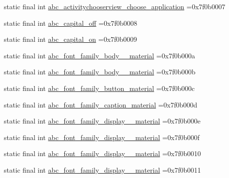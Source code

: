 \begin{DoxyCompactItemize}
static final int \mbox{\hyperlink{classbr_1_1unb_1_1cic_1_1mp_1_1marketmaster_1_1test_1_1R_1_1string_a04d1373e2193084ea31bf43980409963}{abc\+\_\+activitychooserview\+\_\+choose\+\_\+application}} =0x7f0b0007
\item 
static final int \mbox{\hyperlink{classbr_1_1unb_1_1cic_1_1mp_1_1marketmaster_1_1test_1_1R_1_1string_abb29aafbb17b7b46fbcc23c7dab3d6cd}{abc\+\_\+capital\+\_\+off}} =0x7f0b0008
\item 
static final int \mbox{\hyperlink{classbr_1_1unb_1_1cic_1_1mp_1_1marketmaster_1_1test_1_1R_1_1string_abb8733f06d3e6e1e84e5d7b7a4dae567}{abc\+\_\+capital\+\_\+on}} =0x7f0b0009
\item 
static final int \mbox{\hyperlink{classbr_1_1unb_1_1cic_1_1mp_1_1marketmaster_1_1test_1_1R_1_1string_a2884742ab8df9808f5d77505ec28fc39}{abc\+\_\+font\+\_\+family\+\_\+body\+\_\+\_\+material}} =0x7f0b000a
\item 
static final int \mbox{\hyperlink{classbr_1_1unb_1_1cic_1_1mp_1_1marketmaster_1_1test_1_1R_1_1string_aec76f189b2d7715fa09ae334347dcc17}{abc\+\_\+font\+\_\+family\+\_\+body\+\_\+\_\+material}} =0x7f0b000b
\item 
static final int \mbox{\hyperlink{classbr_1_1unb_1_1cic_1_1mp_1_1marketmaster_1_1test_1_1R_1_1string_a5e03df1ec0ad93ca1272d809f54660e3}{abc\+\_\+font\+\_\+family\+\_\+button\+\_\+material}} =0x7f0b000c
\item 
static final int \mbox{\hyperlink{classbr_1_1unb_1_1cic_1_1mp_1_1marketmaster_1_1test_1_1R_1_1string_aeb523334963d42be627172259511b1f4}{abc\+\_\+font\+\_\+family\+\_\+caption\+\_\+material}} =0x7f0b000d
\item 
static final int \mbox{\hyperlink{classbr_1_1unb_1_1cic_1_1mp_1_1marketmaster_1_1test_1_1R_1_1string_a598f82444e9d663c10731628e3740445}{abc\+\_\+font\+\_\+family\+\_\+display\+\_\+\_\+material}} =0x7f0b000e
\item 
static final int \mbox{\hyperlink{classbr_1_1unb_1_1cic_1_1mp_1_1marketmaster_1_1test_1_1R_1_1string_a81c1da908d951b3ffec0f812c6369bba}{abc\+\_\+font\+\_\+family\+\_\+display\+\_\+\_\+material}} =0x7f0b000f
\item 
static final int \mbox{\hyperlink{classbr_1_1unb_1_1cic_1_1mp_1_1marketmaster_1_1test_1_1R_1_1string_aacafbafca23faf9b321b5e171480a185}{abc\+\_\+font\+\_\+family\+\_\+display\+\_\+\_\+material}} =0x7f0b0010
\item 
static final int \mbox{\hyperlink{classbr_1_1unb_1_1cic_1_1mp_1_1marketmaster_1_1test_1_1R_1_1string_a70668b1a9b30b1fdb9622fa9d65b4b20}{abc\+\_\+font\+\_\+family\+\_\+display\+\_\+\_\+material}} =0x7f0b0011

\end{DoxyCompactItemize}
